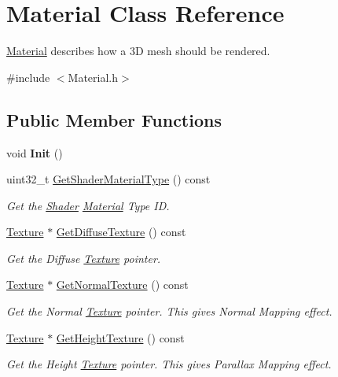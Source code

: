 \hypertarget{classMaterial}{}\section{Material Class Reference}
\label{classMaterial}


\hyperlink{classMaterial}{Material} describes how a 3D mesh should be rendered.  




{\ttfamily \#include $<$Material.\+h$>$}

\subsection*{Public Member Functions}
\begin{DoxyCompactItemize}
\item 
\mbox{\label{classMaterial_aba9619e1e3776d59fe5d92e2d08cb6bc}} 
void {\bfseries Init} ()
\item 
uint32\+\_\+t \hyperlink{classMaterial_a22f3cbf6ae1a551a73138673f8c019f2}{Get\+Shader\+Material\+Type} () const
\begin{DoxyCompactList}\small\item\em Get the \hyperlink{classShader}{Shader} \hyperlink{classMaterial}{Material} Type ID. \end{DoxyCompactList}\item 
\hyperlink{classTexture}{Texture} $\ast$ \hyperlink{classMaterial_a1b9db07af0385115afb5d16056a93f88}{Get\+Diffuse\+Texture} () const
\begin{DoxyCompactList}\small\item\em Get the Diffuse \hyperlink{classTexture}{Texture} pointer. \end{DoxyCompactList}\item 
\hyperlink{classTexture}{Texture} $\ast$ \hyperlink{classMaterial_a308bae8e2917d3dabceb2921c87d6e6f}{Get\+Normal\+Texture} () const
\begin{DoxyCompactList}\small\item\em Get the Normal \hyperlink{classTexture}{Texture} pointer. This gives Normal Mapping effect. \end{DoxyCompactList}\item 
\hyperlink{classTexture}{Texture} $\ast$ \hyperlink{classMaterial_a7fee2a74eae077dfea902c05ef438326}{Get\+Height\+Texture} () const
\begin{DoxyCompactList}\small\item\em Get the Height \hyperlink{classTexture}{Texture} pointer. This gives Parallax Mapping effect. \end{DoxyCompactList}\item 

\end{DoxyCompactItemize}
